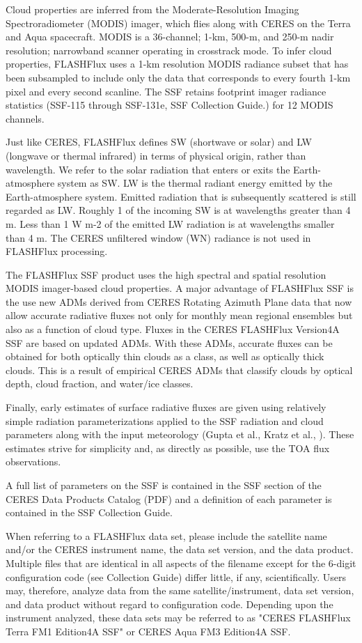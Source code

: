 \documentclass[12pt]{article}
\begin{document}
Cloud properties are inferred from the Moderate-Resolution Imaging Spectroradiometer (MODIS) imager, which flies along with CERES on the Terra and Aqua spacecraft. MODIS is a 36-channel; 1-km, 500-m, and 250-m nadir resolution; narrowband scanner operating in crosstrack mode. To infer cloud properties, FLASHFlux uses a 1-km resolution MODIS radiance subset that has been subsampled to include only the data that corresponds to every fourth 1-km pixel and every second scanline. The SSF retains footprint imager radiance statistics (SSF-115 through SSF-131e, SSF Collection Guide.) for 12 MODIS channels. 

Just like CERES, FLASHFlux defines SW (shortwave or solar) and LW (longwave or thermal infrared) in terms of physical origin, rather than wavelength. We refer to the solar radiation that enters or exits the Earth-atmosphere system as SW. LW is the thermal radiant energy emitted by the Earth-atmosphere system. Emitted radiation that is subsequently scattered is still regarded as LW. Roughly 1 of the incoming SW is at wavelengths greater than 4 m. Less than 1 W m-2 of the emitted LW radiation is at wavelengths smaller than 4 m. The CERES unfiltered window (WN) radiance is not used in FLASHFlux processing.

The FLASHFlux SSF product uses the high spectral and spatial resolution MODIS imager-based cloud properties. A major advantage of  FLASHFlux SSF is the use new ADMs derived from CERES Rotating Azimuth Plane data that now allow accurate radiative fluxes not only for monthly mean regional ensembles  but also as a function of cloud type. Fluxes in the CERES FLASHFlux Version4A SSF are based on updated ADMs. With these ADMs, accurate fluxes can be obtained for both optically thin clouds as a class, as well as optically thick clouds. This is a result of empirical CERES ADMs that classify clouds by optical depth, cloud fraction, and water/ice classes. 


Finally, early estimates of surface radiative fluxes are given using relatively simple radiation parameterizations applied to the SSF radiation and cloud parameters along with the input meteorology (Gupta et al., Kratz et al., ). These estimates strive for simplicity and, as directly as possible, use the TOA flux observations. 


A full list of parameters on the SSF is contained in the SSF section of the CERES Data Products Catalog (PDF) and a definition of each parameter is contained in the SSF Collection Guide. 

When referring  to a FLASHFlux data set, please include the satellite name and/or the CERES instrument name, the data set version, and the data product. Multiple files that are identical in all aspects of the filename except for the 6-digit configuration code (see Collection Guide) differ little, if any, scientifically. Users may, therefore, analyze data from the same satellite/instrument, data set version, and data product without regard to configuration code. Depending upon the instrument analyzed, these data sets may be referred to as "CERES FLASHFlux Terra FM1 Edition4A SSF" or CERES Aqua FM3 Edition4A SSF.
\end{document}
